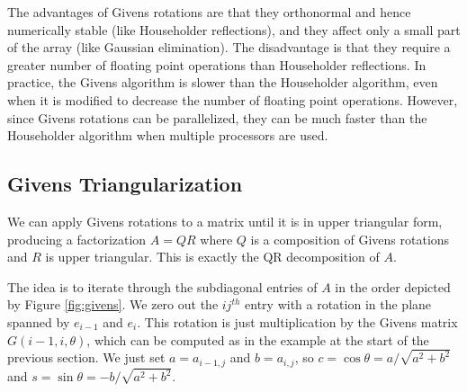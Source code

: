 The advantages of Givens rotations are that they orthonormal and hence numerically stable (like Householder reflections), and they affect only a small part of the array (like Gaussian elimination).
The disadvantage is that they require a greater number of floating point operations than Householder reflections.
In practice, the Givens algorithm is slower than the Householder algorithm, even when it is modified to decrease the number of floating point operations.
However, since Givens rotations can be parallelized, they can be much faster than the Householder algorithm when multiple processors are used.

\subsection*{Givens Triangularization} %

We can apply Givens rotations to a matrix until it is in upper triangular form, producing a factorization $A = QR$ where $Q$ is a composition of Givens rotations and $R$ is upper triangular.
This is exactly the QR decomposition of $A$.

The idea is to iterate through the subdiagonal entries of $A$ in the order depicted by Figure \ref{fig:givens}.
We zero out the $ij^{th}$ entry with a rotation in the plane spanned by $e_{i-1}$ and $e_i$.
This rotation is just multiplication by the Givens matrix $G(i-1,i,\theta)$, which can be computed as in the example at the start of the previous section.
We just set $a=a_{i-1,j}$ and $b=a_{i,j}$, so $c = \cos \theta = a/\sqrt{a^2+b^2}$ and $s = \sin \theta = -b/\sqrt{a^2+b^2}$.

